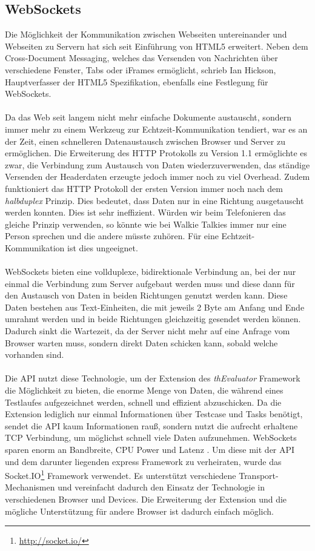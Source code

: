 \subsection{WebSockets}

Die Möglichkeit der Kommunikation zwischen Webseiten untereinander und Webseiten zu Servern hat sich seit Einführung von HTML5 erweitert. Neben dem Cross-Document Messaging, welches das Versenden von Nachrichten über verschiedene Fenster, Tabs oder iFrames ermöglicht, schrieb Ian Hickson, Hauptverfasser der HTML5 Spezifikation, ebenfalls eine Festlegung für WebSockets.\\
\\
Da das Web seit langem nicht mehr einfache Dokumente austauscht, sondern immer mehr zu einem Werkzeug zur Echtzeit-Kommunikation tendiert, war es an der Zeit, einen schnelleren Datenaustausch zwischen Browser und Server zu ermöglichen. Die Erweiterung des HTTP Protokolls zu Version 1.1 ermöglichte es zwar, die Verbindung zum Austausch von Daten wiederzuverwenden, das ständige Versenden der Headerdaten erzeugte jedoch immer noch zu viel \Gls{Overhead}. Zudem funktioniert das HTTP Protokoll der ersten Version immer noch nach dem \textit{halbduplex} Prinzip. Dies bedeutet, dass Daten nur in eine Richtung ausgetauscht werden konnten. Dies ist sehr ineffizient. Würden wir beim Telefonieren das gleiche Prinzip verwenden, so könnte wie bei Walkie Talkies immer nur eine Person sprechen und die andere müsste zuhören. Für eine Echtzeit-Kommunikation ist dies ungeeignet.\\
\\
WebSockets bieten eine vollduplexe, bidirektionale Verbindung an, bei der nur einmal die Verbindung zum Server aufgebaut werden muss und diese dann für den Austausch von Daten in beiden Richtungen genutzt werden kann. Diese Daten bestehen aus Text-Einheiten, die mit jeweils 2 Byte am Anfang und Ende umrahmt werden und in beide Richtungen gleichzeitig gesendet werden \cite{socketsbirectional} können. Dadurch sinkt die Wartezeit, da der Server nicht mehr auf eine Anfrage vom Browser warten muss, sondern direkt Daten schicken kann, sobald welche vorhanden sind. \\
\\
Die API nutzt diese Technologie, um der Extension des \textit{thEvaluator} Framework die Möglichkeit zu bieten, die enorme Menge von Daten, die während eines Testlaufes aufgezeichnet werden, schnell und effizient abzuschicken. Da die Extension lediglich nur einmal Informationen über Testcase und Tasks benötigt, sendet die API kaum Informationen rauß, sondern nutzt die aufrecht erhaltene TCP Verbindung, um möglichst schnell viele Daten aufzunehmen. WebSockets sparen enorm an Bandbreite, CPU Power und \Gls{Latenz} \cite{websockets}. Um diese mit der API und dem darunter liegenden express Framework zu verheiraten, wurde das Socket.IO\footnote{\url{http://socket.io/}} Framework verwendet. Es unterstützt verschiedene Transport-Mechanismen und vereinfacht dadurch den Einsatz der Technologie in verschiedenen Browser und Devices. Die Erweiterung der Extension und die mögliche Unterstützung für andere Browser ist dadurch einfach möglich.\\
